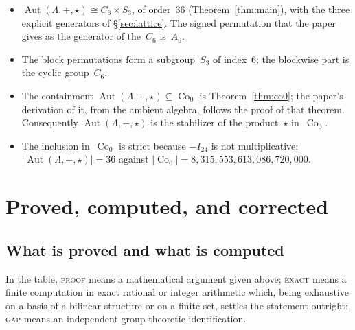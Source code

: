 \documentclass[11pt]{amsart}
\newcommand{\LL}{\Lambda}
\DeclareMathOperator{\Aut}{Aut}
\DeclareMathOperator{\Co}{Co}
\theoremstyle{definition}
\theoremstyle{remark}
\begin{document}
\begin{itemize}[leftmargin=*]
\item $\Aut(\LL,+,\star) \cong C_6 \times S_3$, of order~$36$
  (Theorem~\ref{thm:main}), with the three explicit generators of
  \S\ref{sec:lattice}. The signed permutation that the paper gives as the
  generator of the~$C_6$ is~$A_6$.
\item The block permutations form a subgroup~$S_3$ of index~$6$; the
  blockwise part is the cyclic group~$C_6$.
\item The containment $\Aut(\LL,+,\star) \subseteq \Co_0$ is
  Theorem~\ref{thm:co0}; the paper's derivation of it, from the ambient
  algebra, follows the proof of that theorem. Consequently
  $\Aut(\LL,+,\star)$ is the stabilizer of the product~$\star$ in~$\Co_0$.
\item The inclusion in~$\Co_0$ is strict because $-I_{24}$ is not
  multiplicative; $|\Aut(\LL,+,\star)| = 36$ against
  $|\Co_0| = 8{,}315{,}553{,}613{,}086{,}720{,}000$.
\end{itemize}

\section{Proved, computed, and corrected}\label{sec:corrections}

\subsection{What is proved and what is computed}

In the table, \textsc{proof} means a mathematical argument given above;
\textsc{exact} means a finite computation in exact rational or integer
arithmetic which, being exhaustive on a basis of a bilinear structure or on a
finite set, settles the statement outright; \textsc{gap} means an independent
group-theoretic identification.
\end{document}
